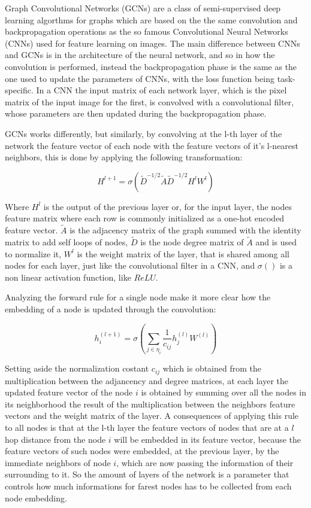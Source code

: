 \documentclass[%
    corpo=13.5pt,
    twoside,
    oldstyle,
    tipotesi=magistrale,
    greek,
    evenboxes
]{toptesi}
\begin{document}
Graph Convolutional Networks (GCNs) are a class of semi-supervised
deep learning algorthms for graphs which are based on the the same
convolution and backpropagation operations as the so famous
Convolutional Neural Networks (CNNs) used for feature learning on
images.
The main difference between CNNs and GCNs is in the architecture of
the neural network, and so in how the convolution is performed, instead
the backpropagation phase is the same as the one used to update the
parameters of CNNs, with the loss function being task-specific.
In a CNN the input matrix of each network layer, which is the pixel matrix
of the input image for the first, is convolved with a convolutional filter,
whose parameters are then updated during the backpropagation phase.

GCNs works differently, but similarly, by convolving at the l-th layer
of the network the feature vector of each node with the feature
vectors of it's l-nearest neighbors, this is done by applying the following
transformation:

\begin{equation}
H^{l+1}=\sigma(\tilde{D}^{-1/2}\tilde{A}\tilde{D}^{-1/2}H^lW^l)
\end{equation}

Where $H^{l}$ is the output of the previous layer or, for the input layer, the
nodes feature matrix where each row is commonly initialized
as a one-hot encoded feature vector. $\tilde{A}$ is the adjacency matrix
of the graph summed with the identity matrix to add self loops of nodes,
$\tilde{D}$ is the node degree matrix of $\tilde{A}$ and is used to
normalize it, $W^l$ is the weight matrix of the layer, that is shared
among all nodes for each layer, just like the convolutional filter in a CNN,
and $\sigma()$ is a non linear activation function, like $ReLU$.

Analyzing the forward rule for a single node make it more clear how the
embedding of a node is updated through the convolution:

\begin{equation}
    h^{(l+1)}_{i}=\sigma(\sum_{j\in\eta_{i}} \frac{1}{c_{ij}}h_j^{(l)}W^{{(l)}})
\end{equation}

Setting aside the normalization costant $c_{ij}$ which is obtained from the
multiplication between the adjancency and degree matrices, at each layer the
updated feature vector of the node $i$ is obtained by summing over all the
nodes in its neighborhood the result of the multiplication between the
neighbors feature vectors and the weight matrix of the layer.
A consequences of applying this rule to all nodes is that at the l-th layer
the feature vectors of nodes that are at a $l$ hop distance from the node $i$
will be embedded in its feature vector, because the feature vectors of such
nodes were embedded, at the previous layer, by the immediate neighbors of
node $i$, which are now passing the information of their surrounding to it.
So the amount of layers of the network is a parameter that controls how much
informations for farest nodes has to be collected from each node embedding.
\end{document}
